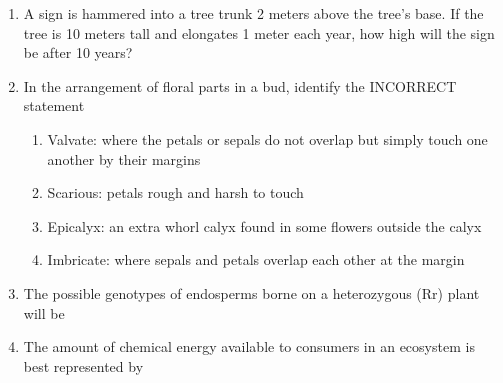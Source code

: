 \documentclass[journal,12pt,onecolumn]{IEEEtran}
\theoremstyle{remark}
\begin{document}
\begin{enumerate}
\item A sign is hammered into a tree trunk 2 meters above the tree’s base. If the tree is 10 meters tall and elongates 1 meter each year, how high will the sign be after 10 years? 
\hfill{}

\begin{enumerate}
\end{enumerate}

\item In the arrangement of floral parts in a bud, identify the INCORRECT statement 
\hfill{}

\begin{enumerate}
\item Valvate: where the petals or sepals do not overlap but simply touch one another by their margins
\item Scarious: petals rough and harsh to touch
\item Epicalyx: an extra whorl calyx found in some flowers outside the calyx
\item Imbricate: where sepals and petals overlap each other at the margin
\end{enumerate}

\item The possible genotypes of endosperms borne on a heterozygous (Rr) plant will be
\hfill{}

\begin{enumerate}
\end{enumerate}

\item The amount of chemical energy available to consumers in an ecosystem is best represented by
\hfill{}

\begin{enumerate}
\end{enumerate}


\end{enumerate}
\end{document}
